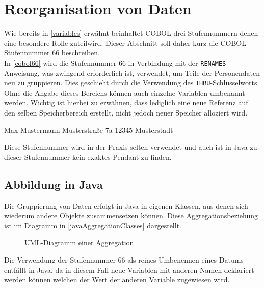 \section{Reorganisation von Daten}

Wie bereits in \autoref{variables} erwähnt beinhaltet COBOL drei Stufennummern denen eine besondere Rolle zuteilwird. Dieser Abschnitt soll daher kurz die COBOL Stufennummer 66 beschreiben.\\

In \autoref{cobol66} wird die Stufennummer 66 in Verbindung mit der \texttt{RENAMES}-Anweisung, was zwingend erforderlich ist, verwendet, um Teile der Personendaten neu zu gruppieren. Dies geschieht durch die Verwendung des \texttt{THRU}-Schlüsselworts. Ohne die Angabe dieses Bereichs können auch einzelne Variablen umbenannt werden. Wichtig ist hierbei zu erwähnen, dass lediglich eine neue Referenz auf den selben Speicherbereich erstellt, nicht jedoch neuer Speicher alloziert wird.

\begin{shellwindow}
Max       Mustermann
Musterstraße  7a   12345 Musterstadt   
\end{shellwindow}

Diese Stufennummer wird in der Praxis selten verwendet und auch ist in Java zu dieser Stufennummer kein exaktes Pendant zu finden. 

\subsection*{Abbildung in Java}
Die Gruppierung von Daten erfolgt in Java in eigenen Klassen, aus denen sich wiederum andere Objekte zusammensetzen können. Diese Aggregationsbeziehung ist im Diagramm in \autoref{javaAggregationClasses} dargestellt. \\

\begin{figure}[H]
    \centering
    \caption{UML-Diagramm einer Aggregation}
    \label{javaAggregationClasses}
\end{figure}

Die Verwendung der Stufennummer 66 als reines Umbenennen eines Datums entfällt in Java, da in diesem Fall neue Variablen mit anderen Namen deklariert werden können welchen der Wert der anderen Variable zugewiesen wird.\\
